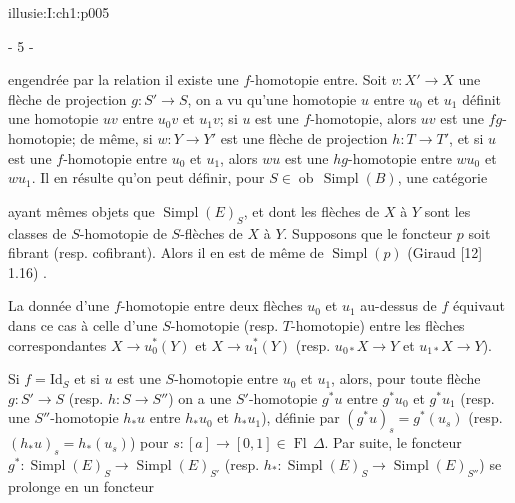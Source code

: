 \IllusieSetPhysicalPageSize{447bp}{698.6bp}
\begin{illusiebodypage}{illusie:I:ch1:p005}
\begin{center}- 5 -\end{center}
\vspace{7bp}\fontsize{9}{18}\selectfont

\hypertarget{illusie:I:ch1:s1:1:p14c1}{}%
\noindent engendrée par la relation \textquotedbl il existe une $f$-homotopie
entre\textquotedbl. Soit $v:X'\longrightarrow X$ une flèche de projection
$g:S'\longrightarrow S$, on a vu qu'une homotopie $u$ entre $u_0$ et $u_1$
définit une homotopie $uv$ entre $u_0v$ et $u_1v$; si $u$ est une
$f$-homotopie, alors $uv$ est une $fg$-homotopie; de même, si
$w:Y\longrightarrow Y'$ est une flèche de projection $h:T\longrightarrow T'$,
et si $u$ est une $f$-homotopie entre $u_0$ et $u_1$, alors $wu$ est une
$hg$-homotopie entre $wu_0$ et $wu_1$. Il en résulte qu'on peut définir, pour
$S\in\operatorname{ob}\,\operatorname{Simpl}(B)$, une catégorie

\hypertarget{illusie:I:ch1:s1:1:eq6}{}%
\noindent{}\par

\hypertarget{illusie:I:ch1:s1:1:p15}{}%
ayant mêmes objets que $\operatorname{Simpl}(E)_S$, et dont les flèches de $X$
à $Y$ sont les classes de $S$-homotopie de $S$-flèches de $X$ à $Y$.
Supposons que le foncteur $p$ soit fibrant (resp. cofibrant). Alors il en est
de même de $\operatorname{Simpl}(p)$ (Giraud [12] 1.16) .

\hypertarget{illusie:I:ch1:s1:1:p16}{}%
La donnée d'une $f$-homotopie entre deux flèches $u_0$ et $u_1$ au-dessus de
$f$ équivaut dans ce cas à celle d'une $S$-homotopie (resp. $T$-homotopie)
entre les flèches correspondantes $X\longrightarrow u_0^*(Y)$ et
$X\longrightarrow u_1^*(Y)$ (resp. $u_{0*}X\longrightarrow Y$ et
$u_{1*}X\longrightarrow Y$).

\hypertarget{illusie:I:ch1:s1:1:p17}{}%
Si $f=\mathrm{Id}_S$ et si $u$ est une $S$-homotopie entre $u_0$ et
$u_1$, alors, pour toute flèche $g:S'\longrightarrow S$ (resp.
$h:S\longrightarrow S''$) on a une $S'$-homotopie $g^*u$ entre $g^*u_0$ et
$g^*u_1$ (resp. une $S''$-homotopie $h_*u$ entre $h_*u_0$ et $h_*u_1$),
\hypertarget{illusie:I:ch1:s1:1:d8}{}%
définie par $(g^*u)_s=g^*(u_s)$ (resp. $(h_*u)_s=h_*(u_s)$) pour
$s:[a]\longrightarrow[0,1]\in\operatorname{Fl}\,\Delta$. Par suite, le
foncteur $g^*:\operatorname{Simpl}(E)_S\longrightarrow
\operatorname{Simpl}(E)_{S'}$ (resp.
$h_*:\operatorname{Simpl}(E)_S\longrightarrow\operatorname{Simpl}(E)_{S''}$)
se prolonge en un foncteur


\end{illusiebodypage}
